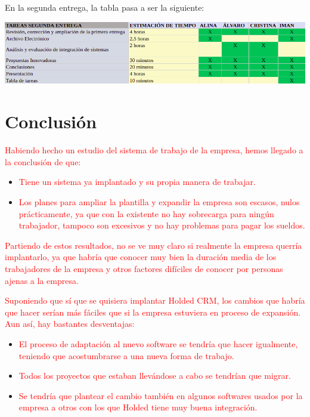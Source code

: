 \documentclass{article}
\begin{document}
En la segunda entrega, la tabla pasa a ser la siguiente:

\begin{center}
\includegraphics[scale=0.4]{images/tareas2.png}
\end{center}

\section{Conclusión}

\textcolor{Red}{Habiendo hecho un estudio del sistema de trabajo de la empresa, hemos llegado a la conclusión de que: }

\begin{itemize}
\item \textcolor{Red}{Tiene un sistema ya implantado y su propia manera de trabajar.}
\item \textcolor{Red}{Los planes para ampliar la plantilla y expandir la empresa son escasos, nulos prácticamente, ya que con la existente no hay sobrecarga para ningún trabajador, tampoco son excesivos y no hay problemas para pagar los sueldos. }
\end{itemize}

\textcolor{Red}{Partiendo de estos resultados, no se ve muy claro si realmente la empresa querría implantarlo, ya que habría que conocer muy bien la duración media de los trabajadores de la empresa y otros factores difíciles de conocer por personas ajenas a la empresa. }

\textcolor{Red}{Suponiendo que sí que se quisiera implantar Holded CRM, los cambios que habría que hacer serían más fáciles que si la empresa estuviera en proceso de expansión. Aun así, hay bastantes desventajas: }

\begin{itemize}
\item \textcolor{Red}{El proceso de adaptación al nuevo software se tendría que hacer igualmente, teniendo que acostumbrarse a una nueva forma de trabajo. }
\item \textcolor{Red}{Todos los proyectos que estaban llevándose a cabo se tendrían que migrar. }
\item \textcolor{Red}{Se tendría que plantear el cambio también en algunos softwares usados por la empresa a otros con los que Holded tiene muy buena integración. }
\end{itemize}
\end{document}
